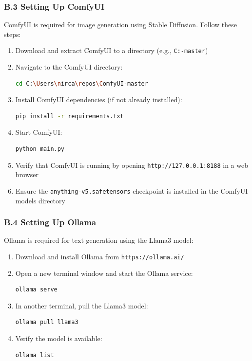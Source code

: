 \documentclass[12pt,a4paper]{article}
\begin{document}
\subsubsection*{B.3 Setting Up ComfyUI}

    ComfyUI is required for image generation using Stable Diffusion. Follow these steps:

    \begin{enumerate}
        \item Download and extract ComfyUI to a directory (e.g., \texttt{C:\Users\nirca\repos\ComfyUI-master})
        \item Navigate to the ComfyUI directory:
        \begin{lstlisting}[language=bash]
cd C:\Users\nirca\repos\ComfyUI-master
        \end{lstlisting}
        \item Install ComfyUI dependencies (if not already installed):
        \begin{lstlisting}[language=bash]
pip install -r requirements.txt
        \end{lstlisting}
        \item Start ComfyUI:
        \begin{lstlisting}[language=bash]
python main.py
        \end{lstlisting}
        \item Verify that ComfyUI is running by opening \texttt{http://127.0.0.1:8188} in a web browser
        \item Ensure the \texttt{anything-v5.safetensors} checkpoint is installed in the ComfyUI models directory
    \end{enumerate}

\subsubsection*{B.4 Setting Up Ollama}

    Ollama is required for text generation using the Llama3 model:

    \begin{enumerate}
        \item Download and install Ollama from \texttt{https://ollama.ai/}
        \item Open a new terminal window and start the Ollama service:
        \begin{lstlisting}[language=bash]
ollama serve
        \end{lstlisting}
        \item In another terminal, pull the Llama3 model:
        \begin{lstlisting}[language=bash]
ollama pull llama3
        \end{lstlisting}
        \item Verify the model is available:
        \begin{lstlisting}[language=bash]
ollama list
        \end{lstlisting}
    \end{enumerate}
\end{document}
